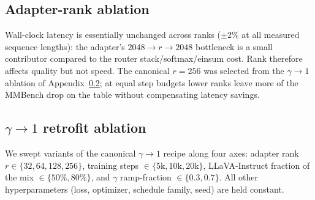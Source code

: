 \documentclass{article}
\begin{document}
\subsection{Adapter-rank ablation}
\label{app:rank_ablation}
Wall-clock latency is essentially unchanged across ranks ($\pm 2\%$ at all measured sequence lengths): the adapter's $2048{\to}r{\to}2048$ bottleneck is a small contributor compared to the router stack/softmax/einsum cost. Rank therefore affects quality but not speed. The canonical $r{=}256$ was selected from the $\gamma{\to}1$ ablation of Appendix~\ref{app:retrofit_ablation}; at equal step budgets lower ranks leave more of the MMBench drop on the table without compensating latency savings.

\subsection{\texorpdfstring{$\gamma{\to}1$ retrofit ablation}{gamma-to-1 retrofit ablation}}
\label{app:retrofit_ablation}
We swept variants of the canonical $\gamma{\to}1$ recipe along four axes: adapter rank $r\in\{32,64,128,256\}$, training steps $\in\{5\text{k},10\text{k},20\text{k}\}$, LLaVA-Instruct fraction of the mix $\in\{50\%,80\%\}$, and $\gamma$ ramp-fraction $\in\{0.3,0.7\}$. All other hyperparameters (loss, optimizer, schedule family, seed) are held constant.
\end{document}
